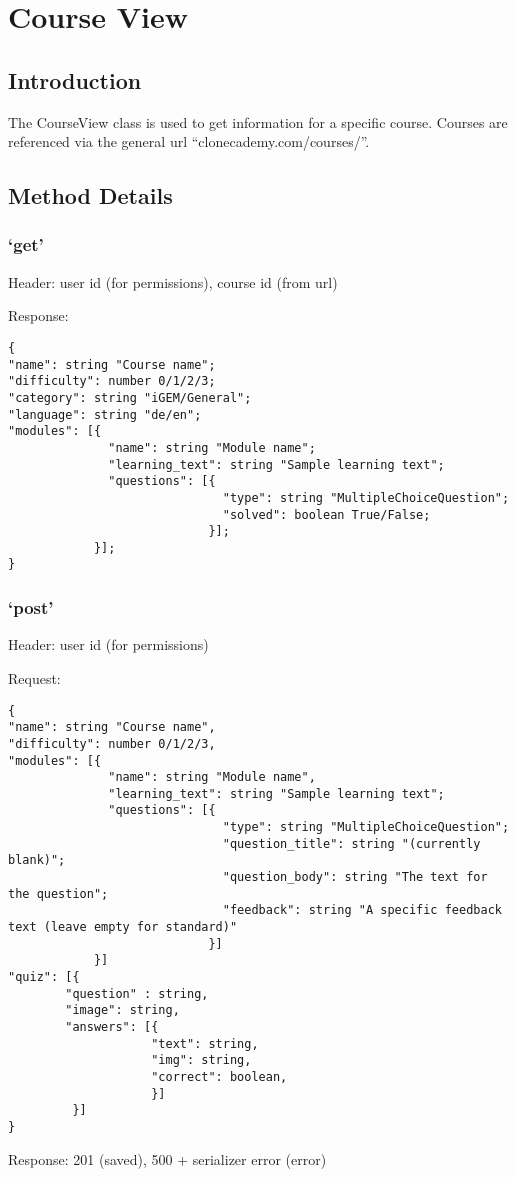  \chapter*{Course View}

\section*{Introduction}\label{introduction}

The CourseView class is used to get information for a specific course.
Courses are referenced via the general url ``clonecademy.com/courses/''.

\section*{Method Details}\label{method-details}

\subsection*{\texorpdfstring{`get'}{get}}\label{get}

Header: user id (for permissions), course id (from url)

Response:

\begin{verbatim}
{
"name": string "Course name";
"difficulty": number 0/1/2/3;
"category": string "iGEM/General";
"language": string "de/en";
"modules": [{
              "name": string "Module name";
              "learning_text": string "Sample learning text";
              "questions": [{
                              "type": string "MultipleChoiceQuestion";
                              "solved": boolean True/False;
                            }];
            }];
}
\end{verbatim}

\subsection*{\texorpdfstring{`post'}{post}}\label{post}

Header: user id (for permissions)

Request:

\begin{verbatim}
{
"name": string "Course name",
"difficulty": number 0/1/2/3,
"modules": [{
              "name": string "Module name",
              "learning_text": string "Sample learning text";
              "questions": [{
                              "type": string "MultipleChoiceQuestion";
                              "question_title": string "(currently blank)";
                              "question_body": string "The text for the question";
                              "feedback": string "A specific feedback text (leave empty for standard)"
                            }]
            }]
"quiz": [{
        "question" : string,
        "image": string,
        "answers": [{
                    "text": string,
                    "img": string,
                    "correct": boolean,
                    }]
         }]
}
\end{verbatim}

Response: 201 (saved), 500 + serializer error (error)